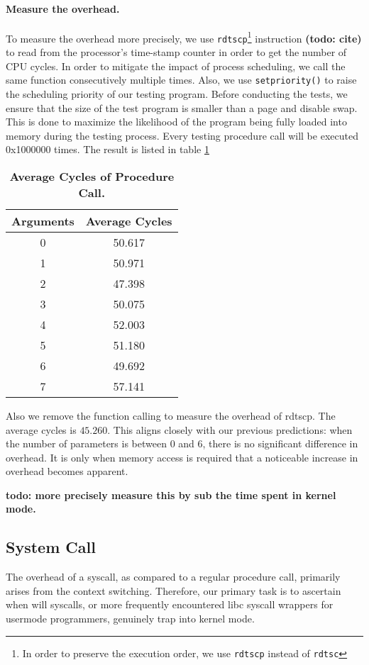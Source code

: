 \paragraph{Measure the overhead.} To measure the overhead more precisely, we use \texttt{rdtscp}\footnote{In order to preserve the execution order, we use \texttt{rdtscp} instead of \texttt{rdtsc}} instruction \textbf{(todo: cite)} to read from the processor’s time-stamp counter in order to get the number of CPU cycles. In order to mitigate the impact of process scheduling, we call the same function consecutively multiple times. Also, we use \texttt{setpriority()} to raise the scheduling priority of our testing program. Before conducting the tests, we ensure that the size of the test program is smaller than a page and disable swap. This is done to maximize the likelihood of the program being fully loaded into memory during the testing process. Every testing procedure call will be executed 0x1000000 times. The result is listed in table \ref{table:procedure-test}
\begin{table}[h]
	\centering
	\begin{tabular}{c|c}
		\hline
		\bf{Arguments} & \bf{Average Cycles} \\ \hline
		0 & 50.617 \\ \hline
		1 & 50.971 \\ \hline
		2 & 47.398 \\ \hline
        3 & 50.075 \\ \hline
        4 & 52.003 \\ \hline
        5 & 51.180 \\ \hline
        6 & 49.692 \\ \hline
        7 & 57.141 \\ \hline
	\end{tabular}
	\caption{\textbf{Average Cycles of Procedure Call.}}
	\label{table:procedure-test}
\end{table}
Also we remove the function calling to measure the overhead of rdtscp.
The average cycles is $45.260$. This aligns closely with our previous predictions: when the number of parameters is between 0 and 6, there is no significant difference in overhead. It is only when memory access is required that a noticeable increase in overhead becomes apparent.

\textbf{todo: more precisely measure this by sub the time spent in kernel mode.}

\subsection{System Call}
The overhead of a syscall, as compared to a regular procedure call, primarily arises from the context switching. Therefore, our primary task is to ascertain when will syscalls, or more frequently encountered libc syscall wrappers for usermode programmers, genuinely trap into kernel mode.

